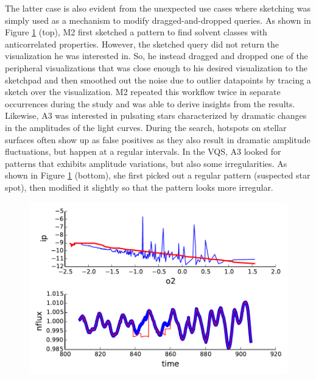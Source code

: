 \par The latter case is also evident from the unexpected use cases where sketching was simply used as a mechanism to modify dragged-and-dropped queries. As shown in Figure \ref{query_modification} (top), M2 first sketched a pattern to find solvent classes with anticorrelated properties. However, the sketched query did not return the visualization he was interested in. So, he instead dragged and dropped one of the peripheral visualizations that was close enough to his desired visualization to the sketchpad and then smoothed out the noise due to outlier datapoints by tracing a sketch over the visualization. M2 repeated this workflow twice in separate occurrences during the study and was able to derive insights from the results. Likewise, A3 was interested in pulsating stars characterized by dramatic changes in the amplitudes of the light curves. During the search, hotspots on stellar surfaces often show up as false positives as they also result in dramatic amplitude fluctuations, but happen at a regular intervals. In the VQS, A3 looked for patterns that exhibits amplitude variations, but also some irregularities. As shown in Figure \ref{query_modification} (bottom), she first picked out a regular pattern (suspected star spot), then modified it slightly so that the pattern looks more irregular.
\begin{figure}[ht!]
    \centering
    \includegraphics[width=\columnwidth]{figures/QueryModificationBySketch.pdf}
    \caption{
    \label{query_modification}}
    \vspace{-10pt}
\end{figure}
